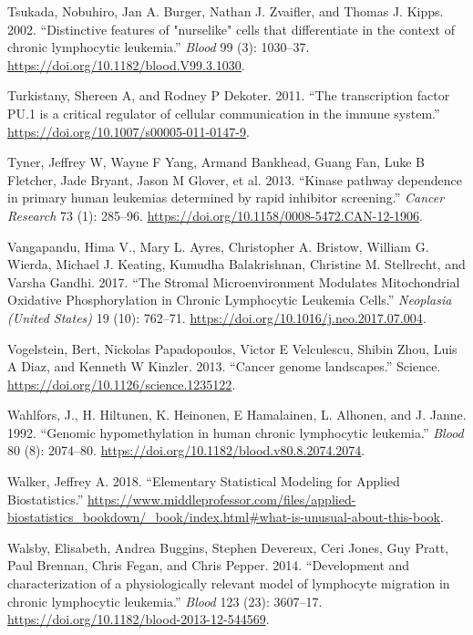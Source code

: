 \documentclass[11pt, a4paper, twosided]{book}
\newenvironment{CSLReferences}%
  {}%
  {\par}
\begin{document}
\begin{CSLReferences}{1}{0}
\leavevmode{}%
Tsukada, Nobuhiro, Jan A. Burger, Nathan J. Zvaifler, and Thomas J. Kipps. 2002. {``{Distinctive features of "nurselike" cells that differentiate in the context of chronic lymphocytic leukemia}.''} \emph{Blood} 99 (3): 1030--37. \url{https://doi.org/10.1182/blood.V99.3.1030}.

\leavevmode{}%
Turkistany, Shereen A, and Rodney P Dekoter. 2011. {``{The transcription factor PU.1 is a critical regulator of cellular communication in the immune system}.''} \url{https://doi.org/10.1007/s00005-011-0147-9}.

\leavevmode{}%
Tyner, Jeffrey W, Wayne F Yang, Armand Bankhead, Guang Fan, Luke B Fletcher, Jade Bryant, Jason M Glover, et al. 2013. {``{Kinase pathway dependence in primary human leukemias determined by rapid inhibitor screening}.''} \emph{Cancer Research} 73 (1): 285--96. \url{https://doi.org/10.1158/0008-5472.CAN-12-1906}.

\leavevmode{}%
Vangapandu, Hima V., Mary L. Ayres, Christopher A. Bristow, William G. Wierda, Michael J. Keating, Kumudha Balakrishnan, Christine M. Stellrecht, and Varsha Gandhi. 2017. {``{The Stromal Microenvironment Modulates Mitochondrial Oxidative Phosphorylation in Chronic Lymphocytic Leukemia Cells}.''} \emph{Neoplasia (United States)} 19 (10): 762--71. \url{https://doi.org/10.1016/j.neo.2017.07.004}.

\leavevmode{}%
Vogelstein, Bert, Nickolas Papadopoulos, Victor E Velculescu, Shibin Zhou, Luis A Diaz, and Kenneth W Kinzler. 2013. {``{Cancer genome landscapes}.''} Science. \url{https://doi.org/10.1126/science.1235122}.

\leavevmode{}%
Wahlfors, J., H. Hiltunen, K. Heinonen, E Hamalainen, L. Alhonen, and J. Janne. 1992. {``{Genomic hypomethylation in human chronic lymphocytic leukemia}.''} \emph{Blood} 80 (8): 2074--80. \url{https://doi.org/10.1182/blood.v80.8.2074.2074}.

\leavevmode{}%
Walker, Jeffrey A. 2018. {``{Elementary Statistical Modeling for Applied Biostatistics}.''} \url{https://www.middleprofessor.com/files/applied-biostatistics_bookdown/_book/index.html\#what-is-unusual-about-this-book}.

\leavevmode{}%
Walsby, Elisabeth, Andrea Buggins, Stephen Devereux, Ceri Jones, Guy Pratt, Paul Brennan, Chris Fegan, and Chris Pepper. 2014. {``{Development and characterization of a physiologically relevant model of lymphocyte migration in chronic lymphocytic leukemia}.''} \emph{Blood} 123 (23): 3607--17. \url{https://doi.org/10.1182/blood-2013-12-544569}.


\end{CSLReferences}
\end{document}
